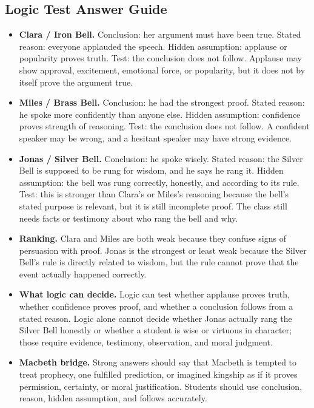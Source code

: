 \documentclass[12pt]{article}
\begin{document}
\subsection*{Logic Test Answer Guide}
\begin{itemize}[leftmargin=*]
\item \textbf{Clara / Iron Bell.} Conclusion: her argument must have been true. Stated reason: everyone applauded the speech. Hidden assumption: applause or popularity proves truth. Test: the conclusion does not follow. Applause may show approval, excitement, emotional force, or popularity, but it does not by itself prove the argument true.
\item \textbf{Miles / Brass Bell.} Conclusion: he had the strongest proof. Stated reason: he spoke more confidently than anyone else. Hidden assumption: confidence proves strength of reasoning. Test: the conclusion does not follow. A confident speaker may be wrong, and a hesitant speaker may have strong evidence.
\item \textbf{Jonas / Silver Bell.} Conclusion: he spoke wisely. Stated reason: the Silver Bell is supposed to be rung for wisdom, and he says he rang it. Hidden assumption: the bell was rung correctly, honestly, and according to its rule. Test: this is stronger than Clara's or Miles's reasoning because the bell's stated purpose is relevant, but it is still incomplete proof. The class still needs facts or testimony about who rang the bell and why.
\item \textbf{Ranking.} Clara and Miles are both weak because they confuse signs of persuasion with proof. Jonas is the strongest or least weak because the Silver Bell's rule is directly related to wisdom, but the rule cannot prove that the event actually happened correctly.
\item \textbf{What logic can decide.} Logic can test whether applause proves truth, whether confidence proves proof, and whether a conclusion follows from a stated reason. Logic alone cannot decide whether Jonas actually rang the Silver Bell honestly or whether a student is wise or virtuous in character; those require evidence, testimony, observation, and moral judgment.
\item \textbf{Macbeth bridge.} Strong answers should say that Macbeth is tempted to treat prophecy, one fulfilled prediction, or imagined kingship as if it proves permission, certainty, or moral justification. Students should use conclusion, reason, hidden assumption, and follows accurately.
\end{itemize}
\end{document}
